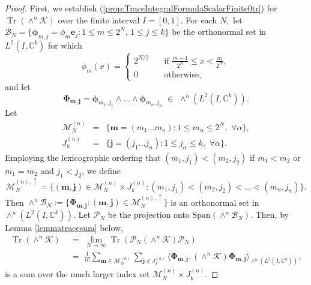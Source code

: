 \documentclass{birkjour}
\theoremstyle{definition}
\theoremstyle{remark}
\numberwithin{equation}{section}
\begin{document}
\begin{proof}
First, we establish (\ref{prop:TraceIntegralFormulaScalarFinite0tr}) for $\operatorname{Tr}(\wedge^n \mathcal{K})$ over the finite interval $I=[0,1]$.
For each $N,$ let  $\mathcal B_N = \{ \boldsymbol\phi_{m,j}  = \phi_m \mathbf e_j: 1 \leq m \leq 2^N, \, 1 \leq j \leq k\}$
 be the orthonormal set in $L^2(I, \mathbb{C}^k)$ for which
\begin{equation}
    \phi_m(x) = 
    \begin{cases}
     2^{N/2} \quad & \text{if } \frac{m-1}{2^N} \leq x < \frac{m}{2^N},\\
    0 \quad &\text{otherwise},
    \end{cases}
\end{equation}
and let
\begin{equation}
    \boldsymbol{\Phi}_{\mathbf{m},\mathbf{j}} = \boldsymbol{\phi}_{m_1, j_1} \wedge \dots \wedge \boldsymbol{\phi}_{m_n, j_n}\,\,\in\,\,\wedge^n(L^2(I,\mathbb C^k)).
\end{equation}
Let
\begin{eqnarray}
\mathcal{M}_N^{(n)} &=& \{\mathbf{m} = (m_1 \dots m_n) : 1 \leq m_{\alpha} \leq 2^N, \,\, \forall \alpha\},\\
J_k^{(n)} &=& \{\mathbf{j} = (j_1 \dots j_n) : 1 \leq j_{\alpha} \leq k, \,\, \forall \alpha\}.
\end{eqnarray}
Employing the lexicographic ordering that $(m_1, j_1) < (m_2, j_2) $
if  $m_1 < m_2$ or  $m_1=m_2$ and $ j_1 < j_2$,
we define
\begin{equation}
    \mathcal{M}_N^{(n), \uparrow} = \{ (\mathbf{m}, \mathbf{j}) \in \mathcal{M}_N^{(n)} \times  J_k^{(n)}
  : (m_1, j_1) < (m_2, j_2) < \dots < (m_n, j_n) \}. 
\end{equation}
Then $\wedge^n\mathcal{B}_N := \{\boldsymbol{\Phi}_{\mathbf{m}, \mathbf{j}} : (\mathbf{m}, \mathbf{j}) \in \mathcal{M}_N^{(n), \uparrow}\}$ is an orthonormal set in $\wedge^n(L^2(I,\mathbb{C}^k))$. Let $\mathcal{P}_N$ be the projection onto $\text{Span}( \wedge^n\mathcal{B}_N)$.
Then, by Lemma \ref{lemmatracesum} below,
\begin{align}\label{37*}
    \operatorname{Tr}({\wedge}^n \mathcal{K}) &\,\,=\,\, 
    \lim_{N \rightarrow \infty} \operatorname{Tr}(\mathcal{P}_N\left({\wedge}^n \mathcal{K}\right)\mathcal{P}_N)  \nonumber \\
    &\,\,=\,\, \frac{1}{n!} \sum_{\mathbf{m} \in \mathcal{M}_N^{(n)}} \sum_{\mathbf{j} \in J_k^{(n)}} \langle \boldsymbol{\Phi}_{\mathbf{m}, \mathbf{j}}, \left( {\wedge}^n \mathcal{K} \right) \boldsymbol{\Phi}_{\mathbf{m}, \mathbf{j}} \rangle_{{\wedge}^n (L^2(I,\mathbb{C}^k))},
\end{align}
is a sum over the much larger index set  $\mathcal{M}_N^{(n)} \times  J_k^{(n)}$.



\end{proof}
\end{document}
